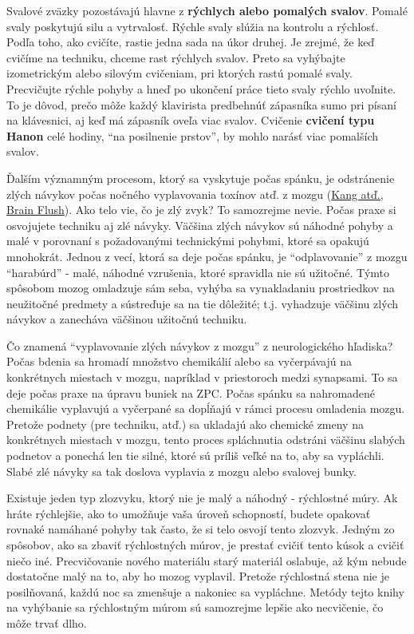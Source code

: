 \documentclass[11pt,a4paper]{book}
\begin{document}
Svalové zväzky pozostávajú hlavne z \textbf{rýchlych alebo pomalých svalov}. Pomalé svaly poskytujú silu a vytrvalosť. Rýchle svaly slúžia na kontrolu a rýchlosť. Podľa toho, ako cvičíte, rastie jedna sada na úkor druhej. Je zrejmé, že keď cvičíme na techniku, chceme rast rýchlych svalov. Preto sa vyhýbajte izometrickým alebo silovým cvičeniam, pri ktorých rastú pomalé svaly. Precvičujte rýchle pohyby a hneď po ukončení práce tieto svaly rýchlo uvoľnite. To je dôvod, prečo môže každý klavirista predbehnúť zápasníka sumo pri písaní na klávesnici, aj keď má zápasník oveľa viac svalov. Cvičenie \textbf{cvičení typu Hanon} celé hodiny, “na posilnenie prstov”, by mohlo narásť viac pomalších svalov.

Ďalším významným procesom, ktorý sa vyskytuje počas spánku, je odstránenie zlých návykov počas nočného vyplavovania toxínov atď. z mozgu (\hyperlink{r:kang}{Kang atď., Brain Flush}). Ako telo vie, čo je zlý zvyk? To samozrejme nevie. Počas praxe si osvojujete techniku ​​aj zlé návyky. Väčšina zlých návykov sú náhodné pohyby a malé v porovnaní s požadovanými technickými pohybmi, ktoré sa opakujú mnohokrát. Jednou z vecí, ktorá sa deje počas spánku, je “odplavovanie” z mozgu “harabúrd” - malé, náhodné vzrušenia, ktoré spravidla nie sú užitočné. Týmto spôsobom mozog omladzuje sám seba, vyhýba sa vynakladaniu prostriedkov na neužitočné predmety a sústreďuje sa na tie dôležité; t.j. vyhadzuje väčšinu zlých návykov a zanecháva väčšinou užitočnú techniku.

Čo znamená “vyplavovanie zlých návykov z mozgu” z neurologického hľadiska? Počas bdenia sa hromadí množstvo chemikálií alebo sa vyčerpávajú na konkrétnych miestach v mozgu, napríklad v priestoroch medzi synapsami. To sa deje počas praxe na úpravu buniek na ZPC. Počas spánku sa nahromadené chemikálie vyplavujú a vyčerpané sa dopĺňajú v rámci procesu omladenia mozgu. Pretože podnety (pre techniku, atď.) sa ukladajú ako chemické zmeny na konkrétnych miestach v mozgu, tento proces spláchnutia odstráni väčšinu slabých podnetov a ponechá len tie silné, ktoré sú príliš veľké na to, aby sa vypláchli. Slabé zlé návyky sa tak doslova vyplavia z mozgu alebo svalovej bunky.

Existuje jeden typ zlozvyku, ktorý nie je malý a náhodný - rýchlostné múry. Ak hráte rýchlejšie, ako to umožňuje vaša úroveň schopností, budete opakovať rovnaké namáhané pohyby tak často, že si telo osvojí tento zlozvyk. Jedným zo spôsobov, ako sa zbaviť rýchlostných múrov, je prestať cvičiť tento kúsok a cvičiť niečo iné. Precvičovanie nového materiálu starý materiál oslabuje, až kým nebude dostatočne malý na to, aby ho mozog vyplavil. Pretože rýchlostná stena nie je posilňovaná, každú noc sa zmenšuje a nakoniec sa vypláchne. Metódy tejto knihy na vyhýbanie sa rýchlostným múrom sú samozrejme lepšie ako necvičenie, čo môže trvať dlho.
\end{document}
